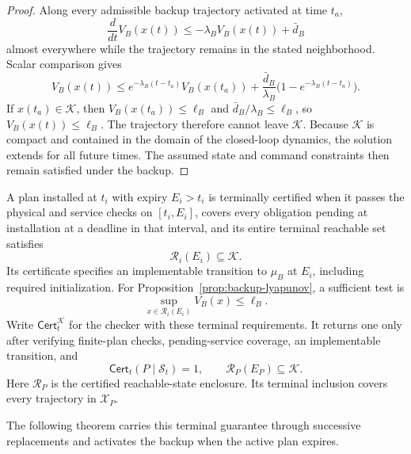 \documentclass[preprint,12pt]{elsarticle}
\begin{document}
\begin{proof}
Along every admissible backup trajectory activated at time $t_a$,
\[
\frac{d}{dt}V_B(x(t))
\le -\lambda_B V_B(x(t))+\bar d_B
\]
almost everywhere while the trajectory remains in the stated neighborhood.
Scalar comparison gives
\[
V_B(x(t))
\le
e^{-\lambda_B(t-t_a)}V_B(x(t_a))
+
\frac{\bar d_B}{\lambda_B}
\bigl(1-e^{-\lambda_B(t-t_a)}\bigr).
\]
If $x(t_a)\in\mathcal K$, then
$V_B(x(t_a))\le\ell_B$ and
$\bar d_B/\lambda_B\le\ell_B$, so
$V_B(x(t))\le\ell_B$. The trajectory therefore cannot leave
$\mathcal K$. Because $\mathcal K$ is compact and contained in the domain of
the closed-loop dynamics, the solution extends for all future times. The
assumed state and command constraints then remain satisfied under the backup.
\end{proof}

A plan installed at $t_i$ with expiry $E_i>t_i$ is terminally certified
when it passes the physical and service checks on $[t_i,E_i]$, covers
every obligation pending at installation at a deadline in that interval,
and its entire terminal reachable set satisfies
\begin{equation}
\mathcal R_i(E_i)\subseteq\mathcal K.
\label{eq:backup-terminal-landing}
\end{equation}
Its certificate specifies an implementable transition to $\mu_B$ at
$E_i$, including required initialization. For
Proposition~\ref{prop:backup-lyapunov}, a sufficient test is
\begin{equation}
\sup_{x\in\mathcal R_i(E_i)}V_B(x)\le\ell_B.
\label{eq:backup-computable-landing}
\end{equation}
Write $\mathsf{Cert}^{\mathcal K}_t$ for the checker with these
terminal requirements. It returns one only after verifying finite-plan
checks, pending-service coverage, an implementable transition, and
\begin{equation}
\mathsf{Cert}_t(P\mid\mathcal S_t)=1,\qquad
\mathcal R_P(E_P)\subseteq\mathcal K.
\label{eq:terminal-checker}
\end{equation}
Here $\mathcal R_P$ is the certified reachable-state enclosure. Its
terminal inclusion covers every trajectory in $\mathcal X_P$.

The following theorem carries this terminal guarantee through successive
replacements and activates the backup when the active plan expires.
\end{document}
